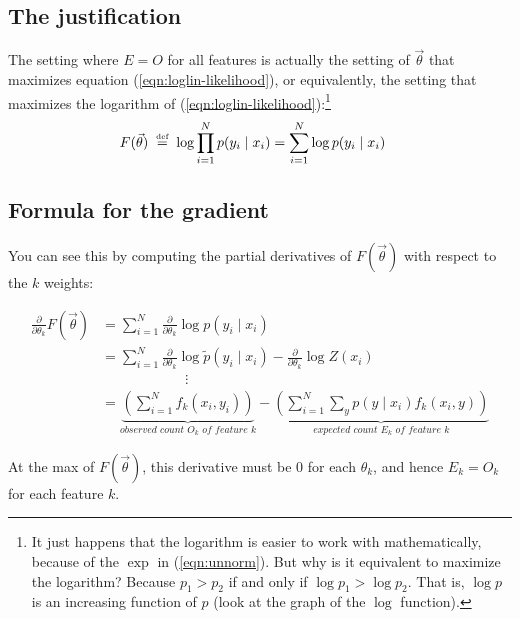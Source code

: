 \documentclass[11pt]{article}
\newcommand{\defeq}{\;\stackrel{\mbox{\tiny def}}{=}\;}
\newcommand{\vtheta}{\vec{\theta}}
\newcommand{\ptilde}{\tilde{p}}
\newcommand{\diffk}{\frac{\partial}{\partial \theta_k}}
\begin{document}
\subsection{The justification}

The setting where $E=O$ for all features is actually the
setting of $\vtheta$ that maximizes equation
(\ref{eqn:loglin-likelihood}), or equivalently, the setting that
maximizes the logarithm of (\ref{eqn:loglin-likelihood}):\footnote{It
  just happens that the logarithm is easier to work with
  mathematically, because of the $\exp$ in (\ref{eqn:unnorm}).  But
  why is it equivalent to maximize the logarithm?  Because $p_1 > p_2$
  if and only if $\log p_1 > \log p_2$.  That is, $\log p$ is
  an increasing function of $p$ (look at the graph of the $\log$ function).%
}
\begin{align}
  F(\vtheta) & \defeq \log \prod_{i=1}^N p(y_i \mid x_i) = \sum_{i=1}^N \log p(y_i \mid x_i)
\label{eqn:loglin-log-likelihood}
\end{align}

\subsection{Formula for the gradient}

You can see this by computing the partial derivatives of $F(\vtheta)$
with respect to the $k$ weights:

\begin{align}
  \diffk F(\vtheta)
  &= \sum_{i=1}^N \diffk \log p(y_i \mid x_i)  \\ %
  &= \sum_{i=1}^N \diffk \log \ptilde(y_i \mid x_i) - \diffk \log Z(x_i) \\
  & \hspace{1in}\vdots \nonumber \\
  &= \underbrace{\left( \sum_{i=1}^N f_k(x_i,y_i) \right)}_{\textit{observed count $O_k$ of feature $k$}}
  - \underbrace{\left( \sum_{i=1}^N \sum_y p(y\mid x_i) f_k(x_i,y) \right)}_{\textit{expected count $E_k$ of feature $k$}} \label{eqn:obsexp}
\end{align}

At the max of $F(\vtheta)$, this derivative must be 0 for each
$\theta_k$, and hence $E_k=O_k$ for each feature $k$.
\end{document}
